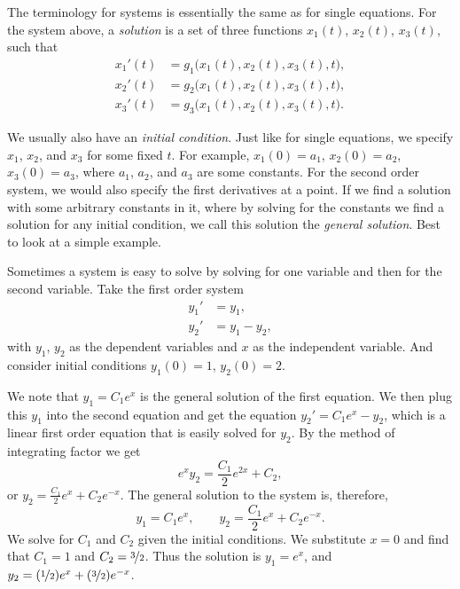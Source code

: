 The terminology for systems is essentially the same as for
single equations.
For the system above, a
\emph{solution}
is a set of three functions $x_1(t)$, $x_2(t)$, $x_3(t)$, such that
\begin{equation*}
\begin{aligned}
x_1'(t) &= g_1\bigl(x_1(t),x_2(t),x_3(t),t\bigr) , \\
x_2'(t) &= g_2\bigl(x_1(t),x_2(t),x_3(t),t\bigr) , \\
x_3'(t) &= g_3\bigl(x_1(t),x_2(t),x_3(t),t\bigr) .
\end{aligned}
\end{equation*}

We usually also have an
\emph{initial condition}.  Just like
for single equations, we specify $x_1$, $x_2$, and $x_3$ for some fixed $t$.
For example, $x_1(0) = a_1$, $x_2(0) = a_2$, $x_3(0) = a_3$,
where $a_1$, $a_2$, and $a_3$ are some constants.  For the second order
system,
we would also specify the first derivatives at a point.
If we find a solution with some arbitrary constants in it, where by solving for the
constants we find a solution for any initial condition, we call this
solution the \emph{general solution}.
Best to look at a simple example.

\begin{example}
Sometimes a system is easy to solve
by solving for one variable and then for the second variable.
Take 
the first order system
\begin{equation*}
\begin{aligned}
y_1' & = y_1 , \\
y_2' & = y_1 - y_2 ,
\end{aligned}
\end{equation*}
with $y_1$, $y_2$ as the dependent variables and $x$ as the independent
variable.  And consider initial conditions
$y_1(0) = 1$, $y_2(0) = 2$.

We note that $y_1 = C_1 e^x$ is the general solution of the first equation.
We then plug this $y_1$ into the second equation
and get the equation $y_2' = C_1e^x - y_2$, which is a linear first order
equation that is easily solved for $y_2$.  By the method of integrating
factor we get
\begin{equation*}
e^x y_2 = \frac{C_1}{2}e^{2x} + C_2 ,
\end{equation*}
or $y_2 = \frac{C_1}{2}e^{x} + C_2e^{-x}$.  The general solution to the system
is, therefore,
\begin{equation*}
y_1 = C_1 e^x , \qquad
y_2 = \frac{C_1}{2}e^{x} + C_2e^{-x} .
\end{equation*}
We solve for $C_1$ and $C_2$ given the initial conditions.
We substitute $x=0$ and find
that $C_1=1$ and $C_2=\nicefrac{3}{2}$.  Thus the solution is
$y_1 = e^x$, and
$y_2 = (\nicefrac{1}{2}) e^x + (\nicefrac{3}{2}) e^{-x}$.
\end{example}

